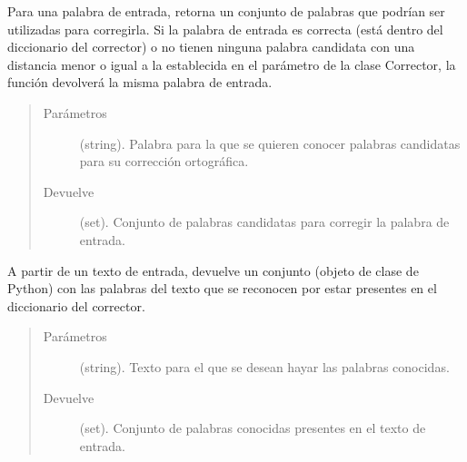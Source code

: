 \documentclass[letterpaper,10pt,openany,spanish]{sphinxmanual}
\begin{document}
\begin{fulllineitems}
\begin{fulllineitems}
\label{\detokenize{funciones/correccion:correccion.Corrector.palabras_candidatas}}
Para una palabra de entrada, retorna un conjunto de palabras que podrían ser utilizadas             para corregirla. Si la palabra de entrada es correcta (está dentro del diccionario             del corrector) o no tienen ninguna palabra candidata con una distancia menor o igual             a la establecida en el parámetro  de la clase Corrector, la función             devolverá la misma palabra de entrada.
\begin{quote}\begin{description}
\item[{Parámetros}] \leavevmode
{} \textendash{} (string). Palabra para la que se quieren conocer palabras candidatas             para su corrección ortográfica.

\item[{Devuelve}] \leavevmode
(set). Conjunto de palabras candidatas para corregir la palabra de entrada.

\end{description}\end{quote}

\end{fulllineitems}


\begin{fulllineitems}
\label{\detokenize{funciones/correccion:correccion.Corrector.palabras_conocidas}}
A partir de un texto de entrada, devuelve un conjunto (objeto de clase  de             Python) con las palabras del texto que se reconocen por estar presentes en             el diccionario del corrector.
\begin{quote}\begin{description}
\item[{Parámetros}] \leavevmode
{} \textendash{} (string). Texto para el que se desean hayar las palabras conocidas.

\item[{Devuelve}] \leavevmode
(set). Conjunto de palabras conocidas presentes en el texto de entrada.


\end{description}
\end{quote}
\end{fulllineitems}
\end{fulllineitems}
\end{document}
